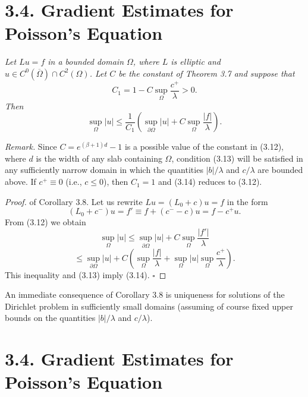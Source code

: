 
\section*{3.4. Gradient Estimates for Poisson's Equation}

\begin{corollary}\label{gt-ch3-grad-cor}
\textit{Let $Lu=f$ in a bounded domain $\Omega$, where $L$ is elliptic and $u\in C^0(\overline{\Omega})\cap C^2(\Omega)$. Let $C$ be the constant of Theorem 3.7 and suppose that}
\begin{equation}
\tag{3.13}
C_1 = 1 - C \sup_{\Omega}\frac{c^+}{\lambda} > 0.
\end{equation}
\textit{Then}
\begin{equation}
\tag{3.14}
\sup_{\Omega}|u| \le \frac{1}{C_1}\left(\sup_{\partial\Omega}|u| + C \sup_{\Omega}\frac{|f|}{\lambda}\right).
\end{equation}
\end{corollary}

\noindent \textit{Remark.} Since $C=e^{(\beta+1)d}-1$ is a possible value of the constant in (3.12), where $d$ is the width of any slab containing $\Omega$, condition (3.13) will be satisfied in any sufficiently narrow domain in which the quantities $|b|/\lambda$ and $c/\lambda$ are bounded above. If $c^+\equiv 0$ (i.e., $c\le 0$), then $C_1=1$ and (3.14) reduces to (3.12).

\begin{proof}
of Corollary 3.8. Let us rewrite $Lu=(L_0+c)u=f$ in the form
\[
(L_0+c^-)u=f' \equiv f+(c^- - c)u = f - c^+u.
\]
From (3.12) we obtain
\[
\sup_{\Omega}|u| \le \sup_{\partial\Omega}|u| + C \sup_{\Omega}\frac{|f'|}{\lambda}
\]
\[
\le \sup_{\partial\Omega}|u| + C\left(\sup_{\Omega}\frac{|f|}{\lambda} + \sup_{\Omega}|u| \sup_{\Omega}\frac{c^+}{\lambda}\right).
\]
This inequality and (3.13) imply (3.14). \hfill $\square$
\end{proof}

\medskip

\noindent An immediate consequence of Corollary 3.8 is uniqueness for solutions of the Dirichlet problem in sufficiently small domains (assuming of course fixed upper bounds on the quantities $|b|/\lambda$ and $c/\lambda$).

\section*{3.4. Gradient Estimates for Poisson's Equation}

